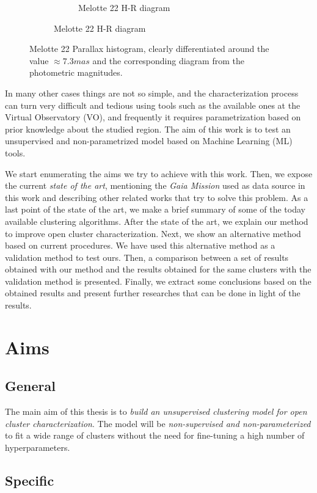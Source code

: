 \documentclass[11pt, a4paper, english]{book}
\begin{document}
\begin{figure}[htbp]
\begin{subfigure}{0.9\textwidth}
\begin{subfigure}[t]{0.45\textwidth}
      \caption{Melotte 22 H-R diagram}
    \end{subfigure}
  \end{subfigure}
  \caption{Melotte 22 Parallax histogram, clearly differentiated around the value $\approx 7.3mas$ and the corresponding diagram from the photometric magnitudes.}
  \label{fig:melotte_22_pm_parallax}
\end{figure}

In many other cases things are not so simple,
and the characterization process can turn very difficult and tedious using tools such as the available ones at the Virtual Observatory (VO),
and frequently it requires parametrization based on prior knowledge about the studied region.
The aim of this work is to test an unsupervised and non-parametrized model based on Machine Learning (ML) tools.

We start enumerating the aims we try to achieve with this work.
Then, we expose the current \emph{state of the art}, mentioning the \emph{Gaia Mission} used as data source in this work and
describing other related works that try to solve this problem.
As a last point of the state of the art, we make a brief summary of some of the today available clustering algorithms.
After the state of the art, we explain our method to improve open cluster characterization.
Next, we show an alternative method based on current procedures. We have used this alternative method as a validation method to test ours.
Then, a comparison between a set of results obtained with our method and the results obtained for the same clusters with the validation method is presented.
Finally, we extract some conclusions based on the obtained results and present further researches that can be done in light of the results.

\chapter{Aims}

\section{General}

The main aim of this thesis is to \emph{build an unsupervised clustering model for open cluster characterization}.
The model will be \emph{non-supervised and non-parameterized} to fit a wide range of clusters without
the need for fine-tuning a high number of hyperparameters.

\section{Specific}
\end{document}

